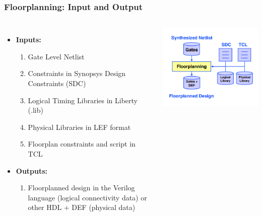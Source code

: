 \documentclass[compress]{beamer}
\begin{document}
\begin{frame}
	\frametitle{Floorplanning: Input and Output}
	\begin{columns}
		\begin{itemize}
			\item \textbf {Inputs:}
			\begin{enumerate}
				\item Gate Level Netlist
				\item Constraints in Synopsys Design Constraints (SDC)
				\item Logical Timing Libraries in Liberty (.lib)
				\item Physical Libraries in LEF format
				\item Floorplan constraints and script in TCL
			\end{enumerate}
			\item \textbf {Outputs:}
			\begin{enumerate}
				\item Floorplanned design in the Verilog language (logical connectivity data) or other HDL + DEF (physical data)
			\end{enumerate}	
		\end{itemize}
		\begin{center}
			\includegraphics[width=\textwidth]{Fplan}
		\end{center}
	\end{columns}
\end{frame}
\end{document}
